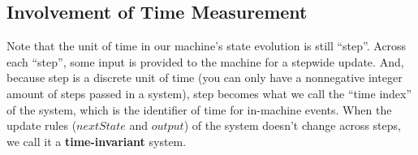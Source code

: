 \subsection{Involvement of Time Measurement}
Note that the unit of time in our machine's state evolution is still ``step''.
Across each ``step'', some input is provided to the machine for a stepwide update.
And, because step is a discrete unit of time (you can only have a nonnegative integer amount of steps passed in a system), step becomes what we call the ``time index'' of the system, which is the identifier of time for in-machine events.
When the update rules ($nextState$ and $output$) of the system doesn't change across steps, we call it a \textbf{time-invariant} system.
